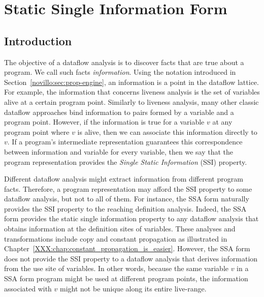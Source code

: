 \chapter{Static Single Information Form }
\label{chap:ssi}

\graphicspath{{img/}{ssi/img/}{part2/ssi/img/}}

\section{Introduction}
\label{sec:ssi:pereira:intro}

The objective of a dataflow analysis is to discover facts that are true about a
program.
We call such facts {\em information}.
Using the notation introduced in Section~\ref{novillo:sec:prop-engine}, an
information is a point in the dataflow lattice.
For example, the information that concerns liveness analysis is the set of
variables alive at a certain program point.
Similarly to liveness analysis, many other classic dataflow approaches bind
information to pairs formed by a variable and a program point.
However, if the information is true for a variable $v$ at any program point where
$v$ is alive, then we can associate this information directly to $v$.
If a program's intermediate representation guarantees this correspondence between
information and variable for every variable, then we say that the program
representation provides the {\em Single Static Information} (SSI) property.

Different dataflow analysis might extract information from different program
facts.
Therefore, a program representation may afford the SSI property to some dataflow
analysis, but not to all of them.
For instance, the SSA form naturally provides the SSI property to the reaching
definition analysis.
Indeed, the SSA form provides the static single information property to any
dataflow analysis that obtains information at the definition sites of
variables.
These analyses and transformations include copy and constant propagation as illustrated in Chapter~\ref{XXX:chap:constant_propagation_is_easier}.
However, the SSA form does not provide the SSI property to a dataflow analysis
that derives information from the use site of variables.
In other words, because the same variable $v$ in a SSA form program might be used
at different program points, the information associated with $v$ might not be
unique along its entire live-range.

